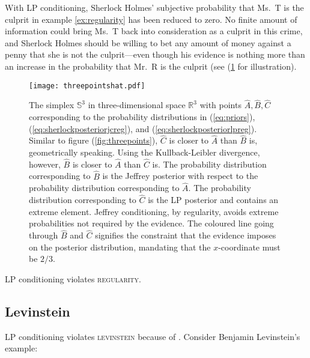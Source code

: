 \documentclass[11pt]{article}
\begin{document}
With LP conditioning, Sherlock Holmes' subjective probability that
Ms.\ T is the culprit in example \ref{ex:regularity} has been reduced
to zero. No finite amount of information could bring Ms.\ T back into
consideration as a culprit in this crime, and Sherlock Holmes should
be willing to bet any amount of money against a penny that she is not
the culprit---even though his evidence is nothing more than an
increase in the probability that Mr.\ R is the culprit (see
(\ref{fig:threepointshat} for illustration).

\begin{figure}[ht]
  \begin{flushright}
    \begin{minipage}[h]{.7\linewidth}
      \texttt{[image: threepointshat.pdf]}
      \caption{\footnotesize The simplex $\mathbb{S}^{3}$ in
        three-dimensional space $\mathbb{R}^{3}$ with points
        $\hat{A},\hat{B},\hat{C}$ corresponding to the probability
        distributions in (\ref{eq:priors}),
        (\ref{eq:sherlockposteriorjcreg}), and
        (\ref{eq:sherlockposteriorlpreg}). Similar to figure
        (\ref{fig:threepoints}), $\hat{C}$ is closer to $\hat{A}$ than
        $\hat{B}$ is, geometrically speaking. Using the
        Kullback-Leibler divergence, however, $\hat{B}$ is closer to
        $\hat{A}$ than $\hat{C}$ is. The probability distribution
        corresponding to $\hat{B}$ is the Jeffrey posterior with
        respect to the probability distribution corresponding to
        $\hat{A}$. The probability distribution corresponding to
        $\hat{C}$ is the LP posterior and contains an extreme element.
        Jeffrey conditioning, by regularity, avoids extreme
        probabilities not required by the evidence. The coloured line
        going through $\hat{B}$ and $\hat{C}$ signifies the constraint
        that the evidence imposes on the posterior distribution,
        mandating that the $x$-coordinate must be $2/3$.}
      \label{fig:threepointshat}
    \end{minipage}
  \end{flushright}
\end{figure}

LP conditioning violates \textsc{regularity}.

\subsection{Levinstein}
\label{Levinstein}

LP conditioning violates \textsc{levinstein} because of 
. Consider Benjamin Levinstein's example:
\end{document}

